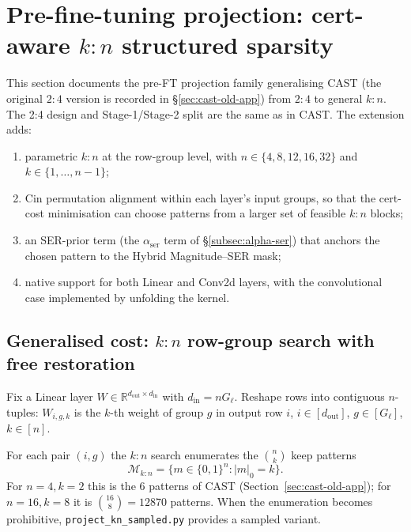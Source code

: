 \documentclass[11pt]{article}
\theoremstyle{plain}
\theoremstyle{definition}
\theoremstyle{remark}
\newcommand{\R}{\mathbb{R}}
\newcommand{\1}{\mathbf{1}}
\begin{document}
\section{Pre-fine-tuning projection: cert-aware \texorpdfstring{$k{:}n$}{k:n} structured sparsity}
\label{sec:cast-2e-pipeline}

This section documents the pre-FT projection family generalising CAST (the original $2{:}4$ version is recorded in \S\ref{sec:cast-old-app}) from $2{:}4$ to general $k{:}n$. The 2:4 design and Stage-1/Stage-2 split are the same as in CAST. The extension adds:

\begin{enumerate}[leftmargin=2em]
\item parametric $k{:}n$ at the row-group level, with $n \in \{4,8,12,16,32\}$ and $k \in \{1,\ldots,n-1\}$;
\item Cin permutation alignment within each layer's input groups, so that the cert-cost minimisation can choose patterns from a larger set of feasible $k{:}n$ blocks;
\item an SER-prior term (the $\alpha_{\mathrm{ser}}$ term of \S\ref{subsec:alpha-ser}) that anchors the chosen pattern to the Hybrid Magnitude--SER mask;
\item native support for both Linear and Conv2d layers, with the convolutional case implemented by unfolding the kernel.
\end{enumerate}

\subsection{Generalised cost: \texorpdfstring{$k{:}n$}{k:n} row-group search with free restoration}
\label{subsec:kn-cost}

Fix a Linear layer $W \in \R^{d_{\mathrm{out}} \times d_{\mathrm{in}}}$ with $d_{\mathrm{in}} = n G_\ell$. Reshape rows into contiguous $n$-tuples: $W_{i,g,k}$ is the $k$-th weight of group $g$ in output row $i$, $i \in [d_{\mathrm{out}}]$, $g \in [G_\ell]$, $k \in [n]$.

For each pair $(i,g)$ the $k{:}n$ search enumerates the $\binom{n}{k}$ keep patterns
\[
\mathcal{M}_{k:n} = \bigl\{ m \in \{0,1\}^n : |m|_0 = k \bigr\}.
\]
For $n=4, k=2$ this is the 6 patterns of CAST (Section~\ref{sec:cast-old-app}); for $n=16, k=8$ it is $\binom{16}{8}=12870$ patterns. When the enumeration becomes prohibitive, \texttt{project\_kn\_sampled.py} provides a sampled variant.
\end{document}
